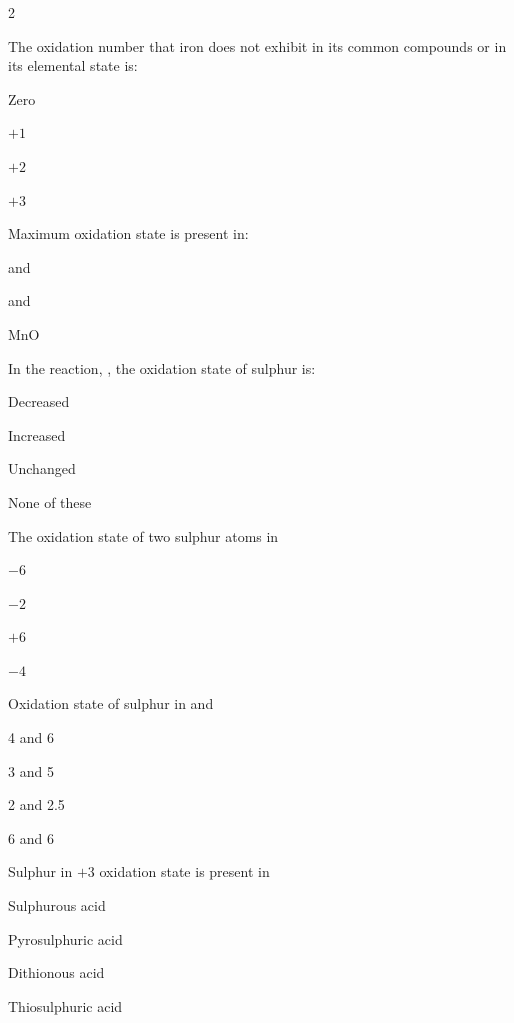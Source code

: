 \documentclass[10pt,a4paper]{article}
\begin{document}
\begin{multicols}{2}
\begin{questions}[start=56]
\item The oxidation number that iron does not exhibit in its common compounds or in its elemental state is:
\begin{options}
  \item Zero
  \item $+1$
  \item $+2$
  \item $+3$
\end{options}

\item Maximum oxidation state is present in:
\begin{options}
  \item {} and 
  \item {}
  \item {} and 
  \item MnO
\end{options}

\item In the reaction, , the oxidation state of sulphur is:
\begin{options}
  \item Decreased
  \item Increased
  \item Unchanged
  \item None of these
\end{options}

\item The oxidation state of two sulphur atoms in 
\begin{options}
  \item $-6$
  \item $-2$
  \item $+6$
  \item $-4$
\end{options}

\item Oxidation state of sulphur in  and 
\begin{options}
  \item 4 and 6
  \item 3 and 5
  \item 2 and 2.5
  \item 6 and 6
\end{options}

\item Sulphur in $+3$ oxidation state is present in
\begin{options}
  \item Sulphurous acid
  \item Pyrosulphuric acid
  \item Dithionous acid
  \item Thiosulphuric acid
\end{options}


\end{questions}
\end{multicols}
\end{document}
